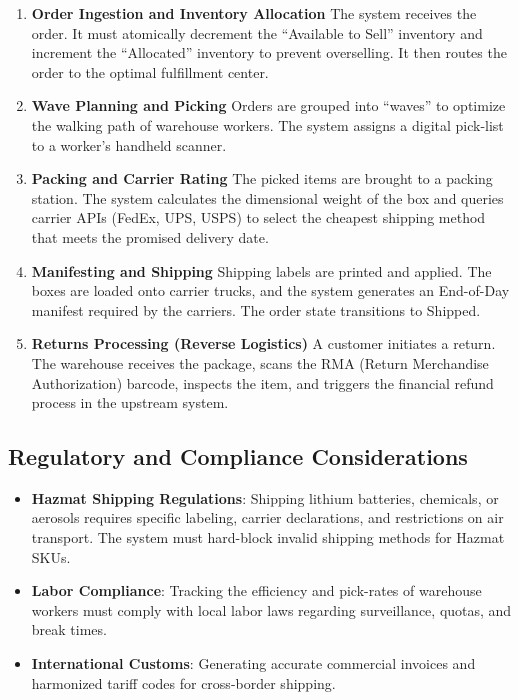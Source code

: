 \begin{enumerate}
\def\labelenumi{\arabic{enumi}.}
\item
  \textbf{Order Ingestion and Inventory Allocation} The system receives
  the order. It must atomically decrement the ``Available to Sell''
  inventory and increment the ``Allocated'' inventory to prevent
  overselling. It then routes the order to the optimal fulfillment
  center.
\item
  \textbf{Wave Planning and Picking} Orders are grouped into ``waves''
  to optimize the walking path of warehouse workers. The system assigns
  a digital pick-list to a worker's handheld scanner.
\item
  \textbf{Packing and Carrier Rating} The picked items are brought to a
  packing station. The system calculates the dimensional weight of the
  box and queries carrier APIs (FedEx, UPS, USPS) to select the cheapest
  shipping method that meets the promised delivery date.
\item
  \textbf{Manifesting and Shipping} Shipping labels are printed and
  applied. The boxes are loaded onto carrier trucks, and the system
  generates an End-of-Day manifest required by the carriers. The order
  state transitions to Shipped.
\item
  \textbf{Returns Processing (Reverse Logistics)} A customer initiates a
  return. The warehouse receives the package, scans the RMA (Return
  Merchandise Authorization) barcode, inspects the item, and triggers
  the financial refund process in the upstream system.
\end{enumerate}

\subsection{Regulatory and Compliance
Considerations}\label{regulatory-and-compliance-considerations-2}

\begin{itemize}
\tightlist
\item
  \textbf{Hazmat Shipping Regulations}: Shipping lithium batteries,
  chemicals, or aerosols requires specific labeling, carrier
  declarations, and restrictions on air transport. The system must
  hard-block invalid shipping methods for Hazmat SKUs.
\item
  \textbf{Labor Compliance}: Tracking the efficiency and pick-rates of
  warehouse workers must comply with local labor laws regarding
  surveillance, quotas, and break times.
\item
  \textbf{International Customs}: Generating accurate commercial
  invoices and harmonized tariff codes for cross-border shipping.
\end{itemize}

